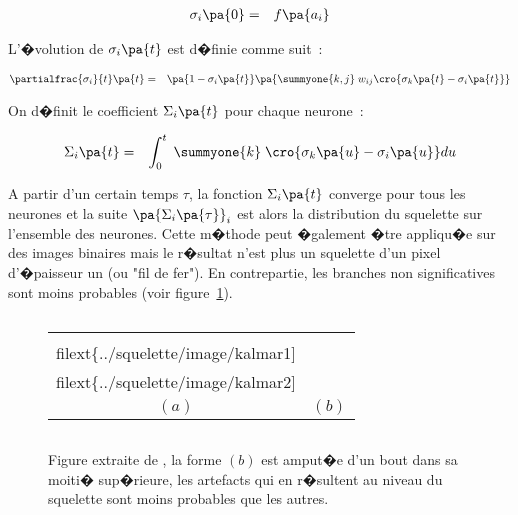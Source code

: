             \begin{eqnarray}
            \sigma_i\pa{0} &=&  f \pa{a_i}
            \end{eqnarray}

L'�volution de $\sigma_i\pa{t}$ est d�finie comme suit~:

            \begin{eqnarray}
            \partialfrac{\sigma_i}{t}\pa{t} &=& \pa{1 - \sigma_i\pa{t} } \pa{
                                                                                        \summyone{k,j} \; w_{ij} \cro{ \sigma_k\pa{t} - \sigma_i \pa{t} } }
            \end{eqnarray}

On d�finit le coefficient $\Sigma_i\pa{t}$ pour chaque neurone~:

            \begin{eqnarray}
             \Sigma_i\pa{t} &=&  \int_0^t \; \summyone{k} \; \cro { \sigma_k\pa{u} - \sigma_i\pa{u} } du
            \end{eqnarray}

            
A partir d'un certain temps $\tau$, la fonction $\Sigma_i\pa{t}$ converge pour tous les neurones et la suite $\pa{\Sigma_i\pa{\tau}}_i$ est alors la distribution du squelette sur l'ensemble des neurones. Cette m�thode peut �galement �tre appliqu�e sur des images binaires mais le r�sultat n'est plus un squelette d'un pixel d'�paisseur un (ou "fil de fer"). En contrepartie, les branches non significatives sont moins probables (voir figure~\ref{image_kalmar_squelette_hexa}).


            \begin{figure}[ht]
        $$\begin{tabular}{|c|c|} \hline
        \texttt{[image: \\filext\{../squelette/image/kalmar1]}} &
        \texttt{[image: \\filext\{../squelette/image/kalmar2]}} \\
        $(a)$ & $(b)$ \\ \hline
        \end{tabular}$$
        \caption{    Figure extraite de , la forme $(b)$ est amput�e d'un bout dans sa moiti�
                            sup�rieure, les artefacts qui en r�sultent au niveau du squelette sont moins probables que les autres.
                            }
        \label{image_kalmar_squelette_hexa}
            \end{figure}







